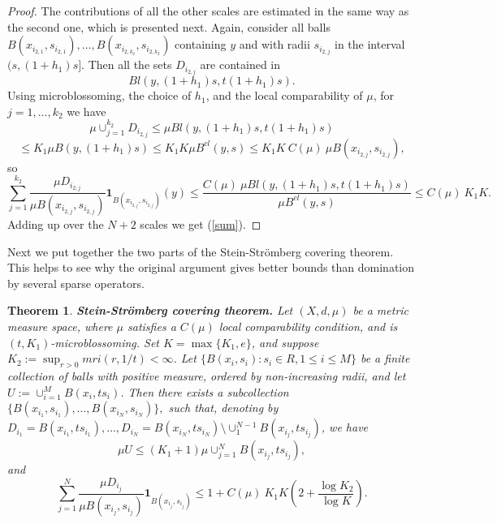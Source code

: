 \documentclass[12pt]{amsart}
\newtheorem{theorem}{Theorem}[section]
\theoremstyle{definition}
\theoremstyle{parrafo}
\begin{document}
\begin{proof}
 The contributions of all the other scales are estimated
in the same way as the second one, which is presented next.
Again, consider all balls 
$B(x_{i_{2,1}}, s_{i_{2,1}}), \dots, B(x_{i_{2,k_2}}, s_{i_{2,k_2}})$ containing $y$ and
with radii $s_{i_{2,j}}$ in the interval 
 $(s, (1 + h_1) s]$. Then all the sets  $D_{i_{2,j}}$  are contained in 
  $$
  Bl(y, (1 + h_1) s, t (1 + h_1) s).
  $$  
  Using microblossoming, the choice
of $h_1$,   and 
the local comparability of $\mu$, for $j = 1, \dots, k_2$ we have
 \begin{equation}\label{minus}
\mu \cup_{j= 1}^{k_2}  D_{i_{2,j}}
\le \mu Bl(y, (1 + h_1) s, t (1 + h_1) s) 
  \end{equation}
$$
\le  
K_1 \mu B (y, (1 + h_1) s)
\le  
K_1 K  \mu B^{cl}(y, s)
\le 
K_1 K \  C(\mu) \  \mu B(x_{i_{2,j}}, s_{i_{2,j}}),
$$ 
so
$$
\sum_{j= 1}^{k_2}  \frac{\mu D_{i_{2,j}}}{\mu B(x_{i_{2,j}}, s_{i_{2,j}})}\mathbf{1}_{B(x_{i_{2,j}}, s_{i_{2,j}})} (y)
\le
\frac{ C(\mu) \  \mu Bl(y, (1 + h_1) s, t (1 + h_1) s)}{\mu B^{cl}(y, s)}
\le C(\mu)  \ K_1 K.
 $$
 Adding up over the $N + 2$ scales  we get (\ref{sum}).
  \end{proof}
  
Next we put together the two parts of the Stein-Str\"omberg covering theorem. This helps
to see why the original argument gives  better bounds than domination by several
sparse operators.

\begin{theorem}\label{StSt3} {\bf Stein-Str\"omberg covering theorem.} Let $(X, d, \mu)$ be a metric measure space, where $\mu$ satisfies a $C(\mu)$ local comparability condition, and
 is  $(t,K_1)$-microblossoming. Set $K = \max\{K_1 , e\}$, and suppose 
$K_2:= \sup_{r > 0} mri(r,1/t) <\infty$.
  Let $\{B(x_i, s_i): s_i \in R, 1 \le i \le M\}$ be  a finite collection
of balls with positive measure, ordered by non-increasing radii, and let $U:= \cup_{i = 1}^M   B(x_i, t s_i)$. Then there exists a
subcollection 
$\{B(x_{i_1}, s_{i_1}), \dots, B(x_{i_N}, s_{i_N})\},
$
 such that,   
 denoting by $D_{i_1} = B(x_{i_1}, t s_{i_1}), \dots,  D_{i_N} = B(x_{i_N}, t s_{i_N})
 \setminus \cup_1^{N-1} B(x_{i_j}, t s_{i_j})$, we have
\begin{equation}\label{set2}
\mu U \le (K_1 + 1) \mu \cup_{j=1}^N   B(x_{i_j}, t s_{i_j}),
\end{equation} and
\begin{equation} \label{bound2}
\sum_{j=1}^N \frac{\mu D_{i_j}}{\mu B(x_{i_j}, s_{i_j})}\mathbf{1}_{B(x_{i_j}, s_{i_j})}
\le 1 +  C(\mu) \ K_1 K \left(2 + \frac{\log K_2}{\log K}\right).
\end{equation}
 \end{theorem}
 
\end{document}
